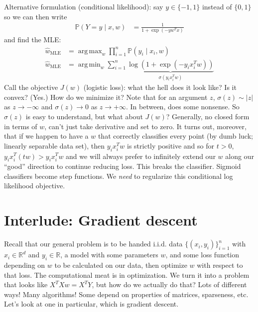 \documentclass[11pt,letterpaper]{article}
\DeclareMathOperator*{\argmin}{arg\,min}
\DeclareMathOperator*{\argmax}{arg\,max}
\theoremstyle{definition}
\theoremstyle{plain}
\numberwithin{equation}{section}
\numberwithin{figure}{section}
\begin{document}
Alternative formulation (conditional likelihood): say $y \in \{-1,1\}$ instead of $\{0,1\}$ so we can then write
%
\begin{align}
	\mathbb{P}(Y=y \mid x,w) &= \frac{1}{1+\exp\left(-y w^T x\right)}
\end{align}
%
and find the MLE:
%
\begin{align}
	\hat{w}_\mathrm{MLE} &= \argmax_w \prod_{i=1}^n \mathbb{P}(y_i \mid x_i,w)\\
	\hat{w}_\mathrm{MLE} &= \argmin_w \sum_{i=1}^n \underbrace{\log\left(1+ \exp\left(-y_i x_i^T w\right) \right)}_{\sigma(y_i x_i^T w)}
\end{align}
%
Call the objective $J(w)$ (logistic loss): what the hell does it look like? Is it convex? (Yes.) How do we minimize it? Note that for an argument $z$, $\sigma(z) \sim |z|$ as $z \to -\infty$ and $\sigma(z) \to 0$ as $z \to +\infty$. In between, does some nonsense. So $\sigma(z)$ is easy to understand, but what about $J(w)$? Generally, no closed form in terms of $w$, can't just take derivative and set to zero. It turns out, moreover, that if we happen to have a $w$ that correctly classifies every point (by dumb luck; linearly separable data set), then $y_i x_i^T w$ is strictly positive and so for $t > 0$, $y_i x_i^T (tw) > y_i x_i^T w$ and we will always prefer to infinitely extend our $w$ along our ``good'' direction to continue reducing loss. This breaks the classifier. Sigmoid classifiers become step functions. We \emph{need} to regularize this conditional log likelihood objective.













\section{Interlude: Gradient descent}
Recall that our general problem is to be handed i.i.d. data $\{(x_i,y_i)\}_{i=1}^n$ with $x_i \in \mathbb{R}^d$ and $y_i \in \mathbb{R}$, a model with some parameters $w$, and some loss function depending on $w$ to be calculated on our data, then optimize $w$ with respect to that loss. The computational meat is in optimization. We turn it into a problem that looks like $X^T X w = X^T Y$, but how do we actually do that? Lots of different ways! Many algorithms! Some depend on properties of matrices, sparseness, etc. Let's look at one in particular, which is gradient descent.
\end{document}
